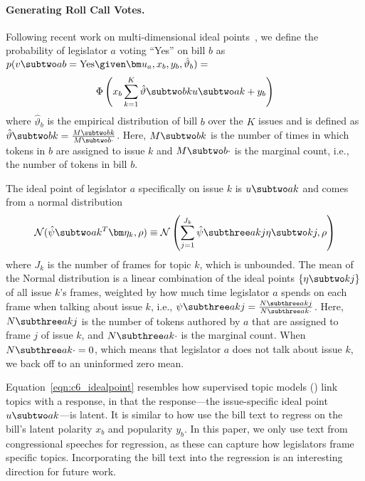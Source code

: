 \paragraph{Generating Roll Call Votes.}
\label{subsec:c6_vote}
Following recent work on multi-dimensional ideal
points~\cite{Lauderdale:AJPS14,Sim:AAAI15:utility}, we define the probability of
legislator $a$ voting ``Yes'' on bill $b$ as $p(v \subtwo ab = \mbox{Yes} \given
\bm u_a, x_b, y_b,\hat{\vartheta}_b) =$
\begin{equation}
\Phi\left(x_b \sum_{k=1}^K \hat{\vartheta} \subtwo bk u \subtwo ak + y_b\right)
\end{equation}
where $\hat{\vartheta}_b$ is the empirical distribution of bill $b$ over the $K$ issues and is
defined as $\hat{\vartheta} \subtwo bk = \frac{M \subtwo bk}{M \subtwo b{\cdot}}$. Here, $M \subtwo
bk$ is the number of times in which tokens in $b$ are assigned to issue $k$ and $M \subtwo
b{\cdot}$ is the marginal count, i.e., the number of tokens in bill $b$.

The ideal point of legislator $a$ specifically on issue $k$ is $u \subtwo ak$
and comes from a normal distribution
\begin{equation}
 \mathcal{N}(\hat{\psi} \subtwo ak^T \bm \eta_k, \rho) \equiv \mathcal{N}\left(\sum_{j=1}^{J_k} \hat{\psi} \subthree akj \eta \subtwo kj, \rho\right)
  \label{eqn:c6_idealpoint}
\end{equation}
where $J_k$ is the number of frames for topic $k$, which is unbounded. The mean
of the Normal distribution is a linear combination of the ideal points $\{\eta
\subtwo kj\}$ of all issue $k$'s frames, weighted by how much time legislator
$a$ spends on each frame when talking about issue $k$, i.e., $\psi \subthree akj
= \frac{N \subthree akj}{N \subthree ak{\cdot}}$. Here, $N \subthree akj$ is the
number of tokens authored by $a$ that are assigned to frame $j$ of issue $k$,
and $N \subthree ak{\cdot}$ is the marginal count. When $N \subthree ak{\cdot} =
0$, which means that legislator $a$ does not talk about issue $k$, we back off
to an uninformed zero mean.


Equation~\ref{eqn:c6_idealpoint} resembles how supervised topic models (\slda{}) link topics with a response, in that the response---the issue-specific ideal point $u \subtwo ak$---is latent. It is similar to how  use the bill text to regress on the bill's latent polarity $x_b$ and popularity $y_b$. In this paper, we only use text from congressional speeches for regression, as these can capture how legislators frame specific topics. Incorporating the bill text into the regression is an interesting direction for future work.

